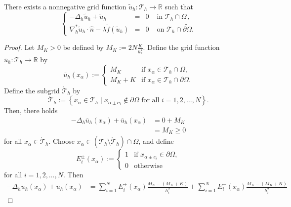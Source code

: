 \documentclass[10pt,a4paper]{amsart}
\begin{document}
\begin{lem}\label{thm:admissibile}
There exists a nonnegative grid function $\widetilde{u}_h : \mathcal{T}_h \to \mathbb{R}$ such that 
\begin{equation}\label{d_sol_single_tilde}
    \left\lbrace\begin{array}{rcll}
    -\Delta_{h} \widetilde{u}_{h}+ \widetilde{u}_{h}&=&0 & \text{ in } \mathcal{T}_h \cap \Omega \,, \\
    \nabla_h^* \widetilde{u}_{h}  \cdot \widehat{n} - \lambda \widetilde{f}(\widetilde{u}_{h}  ) &=& 0 & \text{ on } \mathcal{T}_h \cap \widetilde{\partial \Omega} . 
    \end{array}\right.
\end{equation}    
\end{lem}

\begin{proof}
Let $M_K > 0$ be defined by $M_K := 2 N \frac{K}{h_*^2}$.  
Define the grid function $\overline{u}_h : \mathcal{T}_h \to \mathbb{R}$ by 
\begin{equation}
    \overline{u}_h(x_\alpha) := 
    \begin{cases}
        M_K & \text{if } x_\alpha \in \mathcal{T}_h \cap \Omega , \\ 
        M_K + K & \text{if } x_\alpha \in \mathcal{T}_h \cap \partial \Omega . 
    \end{cases}
\end{equation}
Define the subgrid $\mathring{\mathcal{T}}_h$ by 
\[
    \mathring{\mathcal{T}}_h := \left\{ x_\alpha \in \mathcal{T}_h \mid 
    x_{\alpha \pm \mathbf{e}_i} \notin \partial \Omega \text{ for all } i=1,2,\ldots,N \right\} . 
\]
Then, there holds 
\begin{align*}
    -\Delta_h \overline{u}_h(x_\alpha) + \overline{u}_h(x_\alpha) 
    & = 0 + M_K \\ 
    & = M_K \geq 0 
\end{align*}
for all $x_\alpha \in \mathring{\mathcal{T}}_h$.  
Choose $x_\alpha \in (\mathcal{T}_h \setminus \mathring{\mathcal{T}}_h) \cap \Omega$, 
and define 
\[
    E_i^\pm (x_\alpha) := 
    \begin{cases}
        1 & \text{if } x_{\alpha \pm {e}_i} \in \partial \Omega , \\ 
        0 & \text{otherwise} 
    \end{cases}
\]
for all $i = 1,2,\ldots,N$.  
Then 
\begin{align*}
    -\Delta_h \overline{u}_h(x_\alpha) + \overline{u}_h(x_\alpha)
    & = \sum_{i=1}^N E_i^+(x_\alpha) \frac{M_K - (M_K+K)}{h_i^2} + \sum_{i=1}^N E_i^-(x_\alpha) \frac{M_K - (M_K+K)}{h_i^2} 

\end{align*}
\end{proof}
\end{document}
